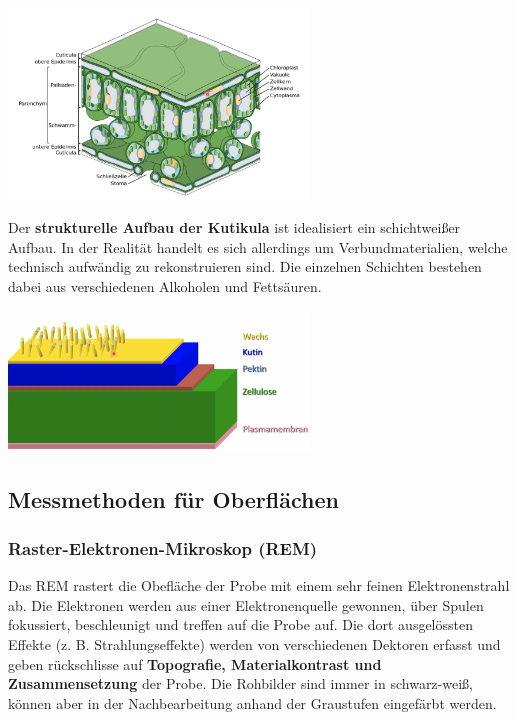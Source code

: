 \begin{center}
	\includegraphics[width=8cm]{lec2/figures/blatt-querschnitt.png}	
\end{center}
Der \textbf{strukturelle Aufbau der Kutikula} ist idealisiert ein schichtweißer Aufbau. In der Realität handelt es sich allerdings um Verbundmaterialien, welche technisch aufwändig zu rekonstruieren sind. Die einzelnen Schichten bestehen dabei aus verschiedenen Alkoholen und Fettsäuren.

\begin{center}
	\includegraphics[width=8cm]{lec2/figures/kutikula-aufbau.png}	
\end{center}

\subsection{Messmethoden für Oberflächen}

\subsubsection{Raster-Elektronen-Mikroskop (REM)}

Das REM rastert die Obefläche der Probe mit einem sehr feinen Elektronenstrahl ab. Die Elektronen werden aus einer Elektronenquelle gewonnen, über Spulen fokussiert, beschleunigt und treffen auf die Probe auf. Die dort ausgelössten Effekte (z. B. Strahlungseffekte) werden von verschiedenen Dektoren erfasst und geben rückschlisse auf \textbf{Topografie, Materialkontrast und Zusammensetzung} der Probe. Die Rohbilder sind immer in schwarz-weiß, können aber in der Nachbearbeitung anhand der Graustufen eingefärbt werden.\\

